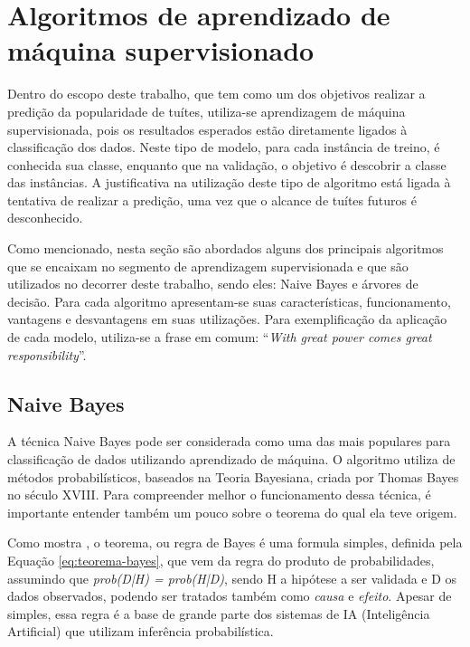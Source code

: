 \documentclass[oneside,openright,12pt]{ufsm_2015} %
\begin{document}

\section{Algoritmos de aprendizado de máquina supervisionado}
\label{sec:fund-alg-am-sup}

    \par Dentro do escopo deste trabalho, que tem como um dos objetivos realizar a predição da popularidade de tuítes, utiliza-se aprendizagem de máquina supervisionada, pois os resultados esperados estão diretamente ligados à classificação dos dados. Neste tipo de modelo, para cada instância de treino, é conhecida sua classe, enquanto que na validação, o objetivo é descobrir a classe das instâncias. A justificativa na utilização deste tipo de algoritmo está ligada à tentativa de realizar a predição, uma vez que o alcance de tuítes futuros é desconhecido.
    
    \par Como mencionado, nesta seção são abordados alguns dos principais algoritmos que se encaixam no segmento de aprendizagem supervisionada e que são utilizados no decorrer deste trabalho, sendo eles: Naive Bayes e árvores de decisão. Para cada algoritmo apresentam-se suas características, funcionamento, vantagens e desvantagens em suas utilizações. Para exemplificação da aplicação de cada modelo, utiliza-se a frase em comum: ``\textit{With great power comes great responsibility}''.


\subsection{Naive Bayes}
\label{sec:fund-naive-bayes}

    \par A técnica Naive Bayes pode ser considerada como uma das mais populares para classificação de dados utilizando aprendizado de máquina. O algoritmo utiliza de métodos probabilísticos, baseados na Teoria Bayesiana, criada por Thomas Bayes no século XVIII. Para compreender melhor o funcionamento dessa técnica, é importante entender também um pouco sobre o teorema do qual ela teve origem.

    \par Como mostra \cite{book:russell:10}, o teorema, ou regra de Bayes é uma formula simples, definida pela Equação \ref{eq:teorema-bayes}, que vem da regra do produto de probabilidades, assumindo que \textit{prob(D|H) = prob(H|D)}, sendo H a hipótese a ser validada e D os dados observados, podendo ser tratados também como \textit{causa} e \textit{efeito}. Apesar de simples, essa regra é a base de grande parte dos sistemas de IA (Inteligência Artificial) que utilizam inferência probabilística.
    
\end{document}
